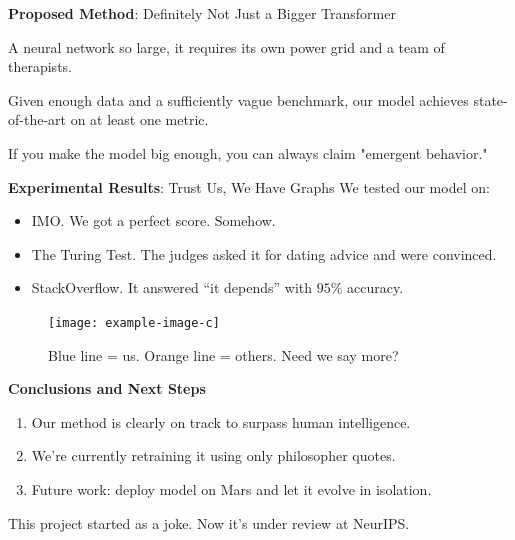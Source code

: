 \documentclass[final,dvipsnames]{beamer}
\begin{document}
\begin{frame}[t]
\begin{columns}[t]
\begin{column}{\colwidth}
\begin{block}{\textbf{Proposed Method}: Definitely Not Just a Bigger Transformer}
				\begin{definition}
					A neural network so large, it requires its own power grid and a team of therapists.
				\end{definition}

				\begin{theorem}
					Given enough data and a sufficiently vague benchmark, our model achieves state-of-the-art on at least one metric.
				\end{theorem}

				\begin{highlight}
					If you make the model big enough, you can always claim "emergent behavior."
				\end{highlight}
			\end{block}

			\begin{block}{\textbf{Experimental Results}: Trust Us, We Have Graphs}
				We tested our model on:

				\begin{itemize}
					\item IMO. We got a perfect score. Somehow.
					\item The Turing Test. The judges asked it for dating advice and were convinced.
					\item StackOverflow. It answered ``it depends'' with \(95\%\) accuracy.
				\end{itemize}

				\begin{figure}[H]
					\centering
					\texttt{[image: example-image-c]}
					\caption{Blue line = us. Orange line = others. Need we say more?}
				\end{figure}
			\end{block}

			\begin{block}{\textbf{Conclusions and Next Steps}}
				\begin{enumerate}
					\item Our method is clearly on track to surpass human intelligence.
					\item We're currently retraining it using only philosopher quotes.
					\item Future work: deploy model on Mars and let it evolve in isolation.
				\end{enumerate}

				\begin{highlight}
					This project started as a joke. Now it's under review at NeurIPS.
				\end{highlight}
			\end{block}


\end{column}
\end{columns}
\end{frame}
\end{document}
